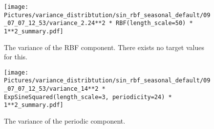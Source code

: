 \begin{figure}[h!]
    \centering
    \texttt{[image: 
       Pictures/variance\_distribtution/sin\_rbf\_seasonal\_default/09\_07\_07\_12\_53/variance\_2.24**2 * RBF(length\_scale=50) * 1**2\_summary.pdf]}
    \caption{The variance of the RBF component. There exists no target values for this.}
    \label{fig:var_rbf}
\end{figure}


\begin{figure}[h!]
    \centering
    \texttt{[image: 
       Pictures/variance\_distribtution/sin\_rbf\_seasonal\_default/09\_07\_07\_12\_53/variance\_14**2 * ExpSineSquared(length\_scale=3, periodicity=24) * 1**2\_summary.pdf]}
    \caption{The variance of the periodic component.}
    \label{fig:var_periodc}
\end{figure}




